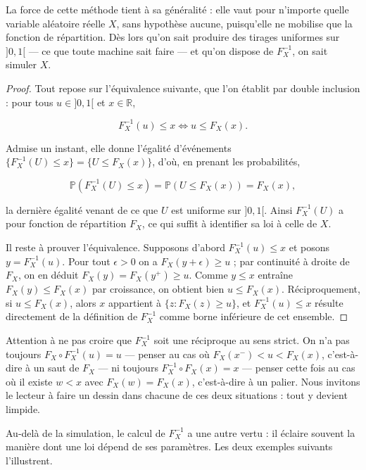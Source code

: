 La force de cette méthode tient à sa généralité : elle vaut pour n'importe quelle variable aléatoire réelle $X$, sans hypothèse aucune, puisqu'elle ne mobilise que la fonction de répartition. Dès lors qu'on sait produire des tirages uniformes sur $]0, 1[$ — ce que toute machine sait faire — et qu'on dispose de $F_X^{-1}$, on sait simuler $X$.

\begin{proof}
Tout repose sur l'équivalence suivante, que l'on établit par double inclusion : pour tous $u \in ]0, 1[$ et $x \in \mathbb{R}$,

$$
F_X^{-1}(u) \leq x \iff u \leq F_X(x).
$$

Admise un instant, elle donne l'égalité d'événements $\{F_X^{-1}(U) \leq x\} = \{U \leq F_X(x)\}$, d'où, en prenant les probabilités,

$$
\mathbb{P}(F_X^{-1}(U) \leq x) = \mathbb{P}(U \leq F_X(x)) = F_X(x),
$$

la dernière égalité venant de ce que $U$ est uniforme sur $]0, 1[$. Ainsi $F_X^{-1}(U)$ a pour fonction de répartition $F_X$, ce qui suffit à identifier sa loi à celle de $X$.

Il reste à prouver l'équivalence. Supposons d'abord $F_X^{-1}(u) \leq x$ et posons $y = F_X^{-1}(u)$. Pour tout $\epsilon > 0$ on a $F_X(y + \epsilon) \geq u$ ; par continuité à droite de $F_X$, on en déduit $F_X(y) = F_X(y^+) \geq u$. Comme $y \leq x$ entraîne $F_X(y) \leq F_X(x)$ par croissance, on obtient bien $u \leq F_X(x)$. Réciproquement, si $u \leq F_X(x)$, alors $x$ appartient à $\{z : F_X(z) \geq u\}$, et $F_X^{-1}(u) \leq x$ résulte directement de la définition de $F_X^{-1}$ comme borne inférieure de cet ensemble.
\end{proof}

\begin{remarque}
Attention à ne pas croire que $F_X^{-1}$ soit une réciproque au sens strict. On n'a pas toujours $F_X \circ F_X^{-1}(u) = u$ — penser au cas où $F_X(x^-) < u < F_X(x)$, c'est-à-dire à un saut de $F_X$ — ni toujours $F_X^{-1} \circ F_X(x) = x$ — penser cette fois au cas où il existe $w < x$ avec $F_X(w) = F_X(x)$, c'est-à-dire à un palier. Nous invitons le lecteur à faire un dessin dans chacune de ces deux situations : tout y devient limpide.
\end{remarque}

Au-delà de la simulation, le calcul de $F_X^{-1}$ a une autre vertu : il éclaire souvent la manière dont une loi dépend de ses paramètres. Les deux exemples suivants l'illustrent.

